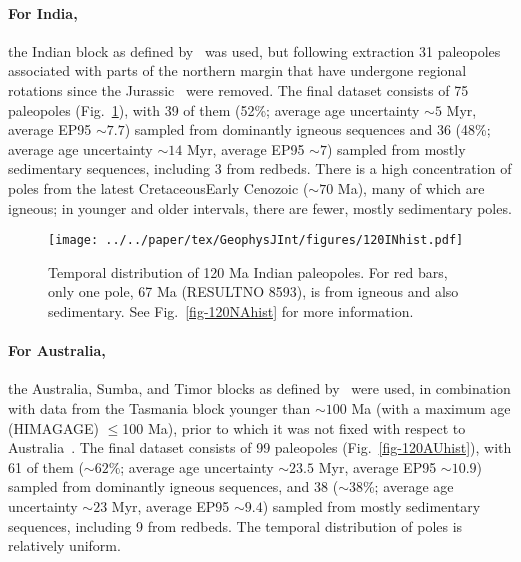 \paragraph{For India,}
the Indian block as defined by~\citet{Y18} was used, but following extraction 31
paleopoles associated with parts of the northern margin that have undergone
regional rotations since the Jurassic~\citep{G15} were removed. The final
dataset consists of 75 paleopoles (Fig.~\ref{fig-120INhist}), with 39 of them
(52\%; average age uncertainty ${\sim}5$ Myr, average EP95 ${\sim}7.7$\degree)
sampled from dominantly igneous sequences and 36 (48\%; average age uncertainty
${\sim}14$ Myr, average EP95 ${\sim}7$\degree) sampled from mostly sedimentary
sequences, including 3 from redbeds. There is a high concentration of poles from
the latest Cretaceous\textendash{}Early Cenozoic (${\sim}70$ Ma),
many of which are igneous; in younger and older intervals, there are fewer,
mostly sedimentary poles.

\begin{figure}[!ht]
\centering
\texttt{[image: ../../paper/tex/GeophysJInt/figures/120INhist.pdf]}
\caption[Distribution of 120 Ma Indian paleopoles]{Temporal
distribution of 120 Ma Indian paleopoles. For red bars, only one
pole, 67 Ma (RESULTNO 8593), is from igneous and also sedimentary.
See Fig.~\ref{fig-120NAhist} for more information.}\label{fig-120INhist}
\end{figure}

\paragraph{For Australia,}
the Australia, Sumba, and Timor blocks as defined by~\citet{Y18} were used, in
combination with data from the Tasmania block younger than ${\sim}100$ Ma (with
a maximum age (HIMAGAGE) $\leq$100 Ma), prior to which it was not fixed with
respect to Australia~\citep{Y18}. The final dataset consists of 99 paleopoles
(Fig.~\ref{fig-120AUhist}), with 61 of them (${\sim}62$\%; average age
uncertainty ${\sim}23.5$ Myr, average EP95 ${\sim}10.9$\degree) sampled from
dominantly igneous sequences, and 38 (${\sim}38$\%; average age uncertainty
${\sim}23$ Myr, average EP95 ${\sim}9.4$\degree) sampled from mostly sedimentary
sequences, including 9 from redbeds. The temporal distribution of poles is
relatively uniform.

